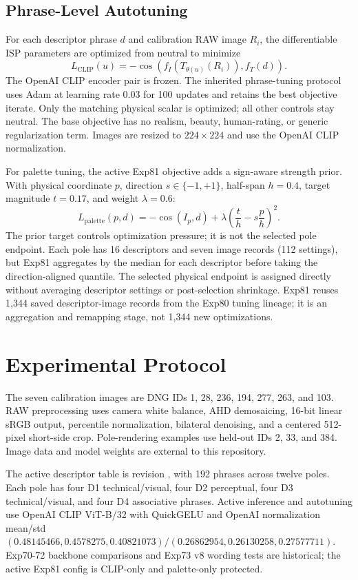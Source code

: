 \documentclass[journal]{IEEEtran}
\newcommand{\cosim}{\operatorname{cos}}
\begin{document}
\subsection{Phrase-Level Autotuning}
For each descriptor phrase $d$ and calibration RAW image $R_i$, the differentiable ISP parameters are optimized from neutral to minimize
\begin{equation}
L_{\mathrm{CLIP}}(u)=-\cosim\left(f_I(T_{\theta(u)}(R_i)),f_T(d)\right).
\end{equation}
The OpenAI CLIP encoder pair is frozen. The inherited phrase-tuning protocol uses Adam at learning rate 0.03 for 100 updates and retains the best objective iterate. Only the matching physical scalar is optimized; all other controls stay neutral. The base objective has no realism, beauty, human-rating, or generic regularization term. Images are resized to $224\times224$ and use the OpenAI CLIP normalization.

For palette tuning, the active Exp81 objective adds a sign-aware strength prior. With physical coordinate $p$, direction $s\in\{-1,+1\}$, half-span $h=0.4$, target magnitude $t=0.17$, and weight $\lambda=0.6$:
\begin{equation}
 L_{\mathrm{palette}}(p,d)=-\cosim(I_p,d)
 +\lambda\left(\frac{t}{h}-s\frac{p}{h}\right)^2.
\end{equation}
The prior target controls optimization pressure; it is not the selected pole endpoint. Each pole has 16 descriptors and seven image records (112 settings), but Exp81 aggregates by the median for each descriptor before taking the direction-aligned quantile. The selected physical endpoint is assigned directly without averaging descriptor settings or post-selection shrinkage. Exp81 reuses 1,344 saved descriptor-image records from the Exp80 tuning lineage; it is an aggregation and remapping stage, not 1,344 new optimizations.

\section{Experimental Protocol}
The seven calibration images are DNG IDs 1, 28, 236, 194, 277, 263, and 103. RAW preprocessing uses camera white balance, AHD demosaicing, 16-bit linear sRGB output, percentile normalization, bilateral denoising, and a centered 512-pixel short-side crop. Pole-rendering examples use held-out IDs 2, 33, and 384. Image data and model weights are external to this repository.

The active descriptor table is revision , with 192 phrases across twelve poles. Each pole has four D1 technical/visual, four D2 perceptual, four D3 technical/visual, and four D4 associative phrases. Active inference and autotuning use OpenAI CLIP ViT-B/32 with QuickGELU and OpenAI normalization mean/std $(0.48145466,0.4578275,0.40821073)/(0.26862954,0.26130258,0.27577711)$. Exp70-72 backbone comparisons and Exp73 v8 wording tests are historical; the active Exp81 config is CLIP-only and palette-only protected.
\end{document}
